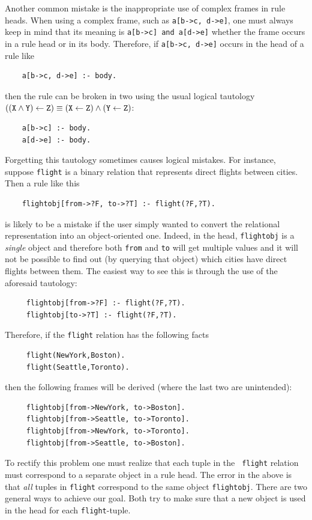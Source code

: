 \documentclass[11pt]{article}
\begin{document}
Another common mistake is the inappropriate use of complex frames in
rule heads. When using a complex frame, such as {\tt a[b->c, d->e]},
one must always keep in mind that  its meaning is {\tt a[b->c] and a[d->e]}
whether the frame occurs in a rule head or in its body. Therefore, if
{\tt a[b->c, d->e]} occurs in the head of a rule like
\begin{verbatim}
    a[b->c, d->e] :- body.  
\end{verbatim}
then the rule can be broken in two using the usual logical tautology 
{\smaller$\tt ((X\wedge Y)\leftarrow Z) \equiv (X\leftarrow
  Z)\wedge(Y\leftarrow Z)$}:
\begin{verbatim}
    a[b->c] :- body.
    a[d->e] :- body.
\end{verbatim}
Forgetting this tautology sometimes causes logical mistakes.
For instance, suppose {\tt flight} is a binary relation that represents
direct flights between cities. Then a rule like this
\begin{verbatim}
    flightobj[from->?F, to->?T] :- flight(?F,?T).  
\end{verbatim}
is likely to be a mistake if the user simply wanted to convert the
relational representation into an object-oriented one. Indeed, in the head,
{\tt flightobj} is a \emph{single} object and therefore both {\tt from} and
{\tt to} will get multiple values and it will not be possible to find out
(by querying that object) which cities have direct flights between them.
The easiest way to see this is through the use of the aforesaid tautology:
\begin{verbatim}
     flightobj[from->?F] :- flight(?F,?T).
     flightobj[to->?T] :- flight(?F,?T).
\end{verbatim}
Therefore, if the {\tt flight} relation has the following facts
\begin{verbatim}
     flight(NewYork,Boston).  
     flight(Seattle,Toronto).  
\end{verbatim}
then the following frames will be derived (where the last two are
unintended):
\begin{verbatim}
     flightobj[from->NewYork, to->Boston].  
     flightobj[from->Seattle, to->Toronto].  
     flightobj[from->NewYork, to->Toronto].  
     flightobj[from->Seattle, to->Boston].  
\end{verbatim}
To rectify this problem one must realize that each tuple in the {\tt
  flight} relation must correspond to a separate object in a rule head.
The error in the above is that \emph{all} tuples in {\tt flight}
correspond to the same object {\tt flightobj}.  There are two general ways
to achieve our goal. Both try to make sure that a new object is used in
the head for each {\tt flight}-tuple.
\end{document}
